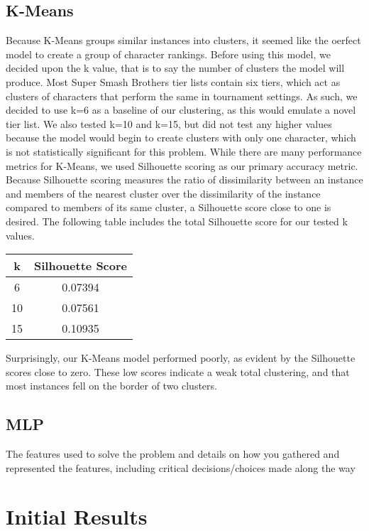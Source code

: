 \documentclass{article}
\begin{document}
\subsection{K-Means}

Because K-Means groups similar instances into clusters, it seemed like the oerfect model to create a group of character rankings.
Before using this model, we decided upon the k value, that is to say the number of clusters the model will produce.
Most Super Smash Brothers tier lists contain six tiers, which act as clusters of characters that perform the same in tournament settings.
As such, we decided to use k=6 as a baseline of our clustering, as this would emulate a novel tier list.
We also tested k=10 and k=15, but did not test any higher values because the model would begin to create clusters with only one character, which is not statistically significant for this problem.
While there are many performance metrics for K-Means, we used Silhouette scoring as our primary accuracy metric.
Because Silhouette scoring measures the ratio of dissimilarity between an instance and members of the nearest cluster over the dissimilarity of the instance compared to members of its same cluster, a Silhouette score close to one is desired.
The following table includes the total Silhouette score for our tested k values.

\begin{center}
\begin{tabular}{c c}
\toprule
k & Silhouette Score\\
\midrule
6 & 0.07394\\
10 & 0.07561\\
15 & 0.10935\\
\bottomrule
\end{tabular}
\end{center}

Surprisingly, our K-Means model performed poorly, as evident by the Silhouette scores close to zero.
These low scores indicate a weak total clustering, and that most instances fell on the border of two clusters.

\subsection{MLP}

The features used to solve the problem and details on how you
gathered and represented the features, including critical
decisions/choices made along the way


\section{Initial Results}
\end{document}
